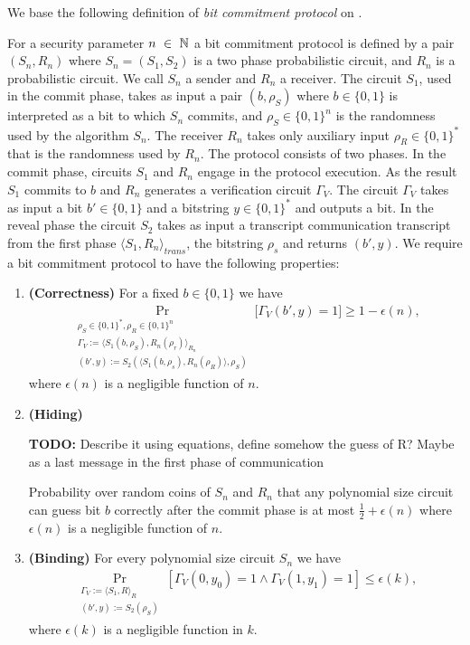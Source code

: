 We base the following definition of \textit{bit commitment protocol} on \cite{LectureNotesComThCrypto}.
\begin{definition}
  \label{def:bit_commitment}
For a security parameter $n~\in~\mathbb{N}$ a \textnormal{bit commitment protocol} is defined by a pair $(S_n, R_n)$
where $S_n = (S_1, S_2)$ is a two phase probabilistic circuit, and $R_n$ is a probabilistic circuit.
We call $S_n$ a sender and $R_n$ a receiver. The circuit $S_1$, used in the commit phase,
takes as input a pair $(b, \rho_S)$ where $b \in \{0,1\}$ is interpreted as a bit to which $S_n$
commits, and $\rho_S \in \{0,1\}^{n}$ is the randomness used by the algorithm $S_n$.
The receiver $R_n$ takes only auxiliary input $\rho_R \in \{0,1\}^{*}$ that is the randomness used by $R_n$.
The protocol consists of two phases. In the commit phase, circuits $S_1$ and $R_n$ engage in the protocol execution.
As the result $S_1$ commits to $b$ and $R_n$ generates a verification circuit $\Gamma_V$.
The circuit $\Gamma_V$ takes as input a bit $b' \in \{0,1\}$ and a bitstring $y \in \{0,1\}^{*}$ and outputs a bit.
In the reveal phase the circuit $S_2$ takes as input a transcript communication transcript from the first phase
$\langle S_1, R_n \rangle_{\mathit{trans}}$, the bitstring $\rho_s$ and returns $(b', y)$.
We require a bit commitment protocol to have the following properties:
\begin{enumerate}[]
\item{\textnormal{\textbf{(Correctness)}}} For a fixed $b \in \{0,1\}$ we have
  \begin{align*}
    \underset{\substack{\rho_S \in \{0,1\}^{*}, \rho_R \in \{0,1\}^{n} \\
        \Gamma_V := \langle S_1(b,\rho_S), R_n(\rho_r) \rangle_{R_n} \\
        (b',y) := S_2(\langle S_1(b,\rho_s), R_n(\rho_R) \rangle,\rho_S)}}{\Pr}\Big[\Gamma_V(b',y) = 1 \Big] \geq 1 - \epsilon(n),
  \end{align*}
where $\epsilon(n)$ is a negligible function of $n$.
\item{\textnormal{\textbf{(Hiding)}}}
  \begin{todo}
    \textbf{TODO:} Describe it using equations, define somehow the guess of R? Maybe as a last message in the first phase of communication
  \end{todo}
  Probability over random coins of $S_n$ and $R_n$ that any polynomial size circuit
  can guess bit $b$ correctly after the commit phase is at most $\frac{1}{2} + \epsilon(n)$ where $\epsilon(n)$ is a negligible function of $n$.
\item{\textnormal{\textbf{(Binding)}}}
  For every polynomial size circuit $S_n$ we have
  \begin{align*}
    \underset{\substack{\Gamma_V := \langle S_1, R \rangle_{R} \\ (b',y) := S_2(\rho_S)}}{\Pr}[\Gamma_V(0,y_0) = 1 \land \Gamma_V(1,y_1) = 1] \leq \epsilon(k),
  \end{align*}
  where $\epsilon(k)$ is a negligible function in $k$.
\end{enumerate}
\end{definition}

